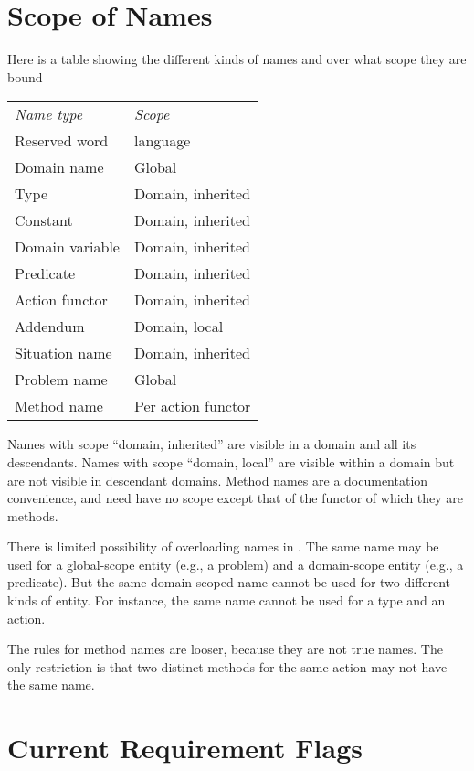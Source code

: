 \section{Scope of Names}

Here is a table showing the different kinds of names and over what
scope they are bound

\begin{tabbing}
\begin{tabular}{l|l}
{\it Name type } & {\it Scope} \\
Reserved word & \lang{} language \\
Domain name & Global \\
Type  & Domain, inherited \\
Constant  & Domain, inherited \\
Domain variable & Domain, inherited \\
Predicate  & Domain, inherited \\
Action functor &  Domain, inherited \\
Addendum & Domain, local \\
Situation name & Domain, inherited \\
Problem name & Global \\
Method name & Per action functor
\end{tabular}
\end{tabbing}

Names with scope ``domain, inherited'' are visible in a domain and all
its descendants.  Names with scope ``domain, local'' are visible
within a domain but are not visible in descendant domains.  Method
names are a documentation convenience, and need have no scope except
that of the functor of which they are methods.

There is limited possibility of overloading names in \lang.  The same
name may be used for a global-scope entity (e.g., a problem) and a
domain-scope entity (e.g., a predicate).  But the same domain-scoped
name cannot be used for two different kinds of entity.  For instance,
the same name cannot be used for a type and an action.

The rules for method names are looser, because they are not true
names.  The only restriction is that two distinct methods for the same
action may not have the same name.

\section{Current Requirement Flags}
\label{requirements}

